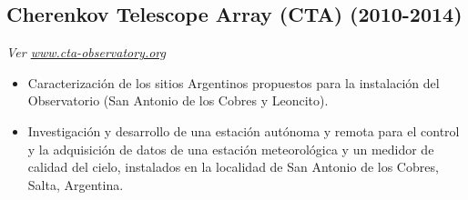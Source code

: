 \subsection*{Cherenkov Telescope Array (CTA) (2010-2014)}
{\small{\textit{Ver \href{http://www.cta-observatory.org}{www.cta-observatory.org}}}}
\begin{itemize}
\item Caracterización de los sitios Argentinos propuestos para la instalación del Observatorio (San Antonio de los Cobres y Leoncito). %
\item Investigación y desarrollo de una estación autónoma y remota para el control y la adquisición de datos de una estación meteorológica y un medidor de calidad del cielo, instalados en la localidad de San Antonio de los Cobres, Salta, Argentina.
\end{itemize}

